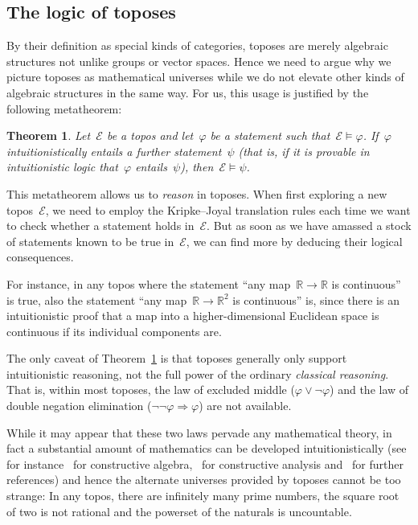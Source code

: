 \documentclass[oneside]{amsart}
\theoremstyle{definition}
\theoremstyle{plain}
\newtheorem{thm}[defn]{Theorem}
\theoremstyle{remark}
\newcommand{\E}{\mathcal{E}}
\newcommand{\RR}{\mathbb{R}}
\renewcommand{\_}{\mathpunct{.}\,}
\newcommand{\?}{\,{:}\,}
\begin{document}
\subsection{The logic of toposes} By their definition as special kinds of
categories, toposes are merely algebraic structures not unlike groups or vector
spaces. Hence we need to argue why we picture toposes as mathematical universes
while we do not elevate other kinds of algebraic structures in the same way.
For us, this usage is justified by the following metatheorem:

\begin{thm}\label{thm:reasoning}Let~$\E$ be a topos and let~$\varphi$ be a
statement such that~$\E \models \varphi$. If~$\varphi$ intuitionistically
entails a further statement~$\psi$ (that is, if it is provable in
intuitionistic logic that~$\varphi$ entails~$\psi$), then~$\E \models
\psi$.\end{thm}

This metatheorem allows us to \emph{reason} in toposes. When first exploring a
new topos~$\E$, we need to employ the Kripke--Joyal translation rules each time
we want to check whether a statement holds in~$\E$. But as soon as we
have amassed a stock of statements known to be true in~$\E$, we can find more
by deducing their logical consequences.

For instance, in any topos where the statement ``any map~$\RR \to \RR$ is
continuous'' is true, also the statement ``any map~$\RR \to \RR^2$ is
continuous'' is, since there is an intuitionistic proof that a map into a
higher-dimensional Euclidean space is continuous if its individual components
are.

The only caveat of Theorem~\ref{thm:reasoning} is that toposes generally only
support intuitionistic reasoning, not the full power of the ordinary
\emph{classical reasoning}. That is, within most toposes, the law of excluded
middle ($\varphi \vee \neg\varphi$) and the law of double negation elimination
($\neg\neg\varphi \Rightarrow \varphi$) are not available.

While it may appear that these two laws pervade any mathematical theory, in
fact a substantial amount of mathematics can be developed intuitionistically
(see for
instance~\cite{mines-richman-ruitenburg:constructive-algebra,lombardi-quitte:constructive-algebra}
for constructive algebra,~\cite{bishop-bridges:constructive-analysis} for
constructive analysis
and~\cite{bauer:int-mathematics,bauer:video,melikhov:intuitionistic-logic} for
further references) and hence the alternate universes provided by toposes
cannot be too strange: In any topos, there are infinitely many prime numbers,
the square root of two is not rational and the powerset of the naturals is
uncountable.
\end{document}
